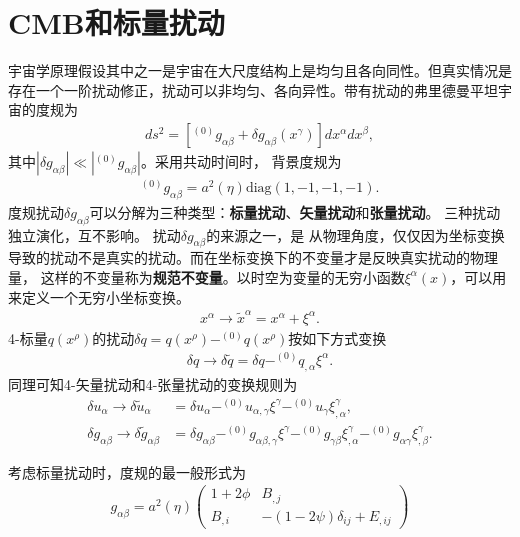 \section{CMB和标量扰动}

宇宙学原理假设其中之一是宇宙在大尺度结构上是均匀且各向同性。但真实情况是存在一个一阶扰动修正，扰动可以非均匀、各向异性。带有扰动的弗里德曼平坦宇宙的度规为
\begin{align}
  \label{eq:perturbation-metric}
  ds^2=\left[^{(0)}g_{\alpha\beta}+\delta g_{\alpha\beta}(x^{\gamma})
  \right]dx^{\alpha}dx^{\beta},
\end{align}
其中$|\delta g_{\alpha\beta}|\ll|^{(0)}g_{\alpha\beta}|$。采用共动时间时，
背景度规为
\begin{align}
  \label{eq:background-metric}
  ^{(0)}g_{\alpha\beta}=a^2(\eta)\text{diag}(1, -1, -1, -1).
\end{align}
度规扰动$\delta
g_{\alpha\beta}$可以分解为三种类型：\textbf{标量扰动}、\textbf{矢量扰动}和\textbf{张量扰动}。
三种扰动独立演化，互不影响。
扰动$\delta g_{\alpha\beta}$的来源之一，是
从物理角度，仅仅因为坐标变换导致的扰动不是真实的扰动。而在坐标变换下的不变量才是反映真实扰动的物理量，
这样的不变量称为\textbf{规范不变量}。以时空为变量的无穷小函数$\xi^{\alpha}(x)$，可以用来定义一个无穷小坐标变换。
\begin{align}
  \label{eq:coordinate-transformation}
  x^{\alpha} \rightarrow \tilde{x}^{\alpha}=x^{\alpha}+\xi^{\alpha}.
\end{align}
4-标量$q(x^{\rho})$的扰动$\delta
q=q(x^{\rho})-^{(0)}q(x^{\rho})$按如下方式变换
\begin{align}
  \label{eq:scalar-perturbation-transformation}
  \delta q \rightarrow \delta\tilde{q}=\delta q
  -^{(0)}q_{,\alpha}\xi^{\alpha}.
\end{align}
同理可知4-矢量扰动和4-张量扰动的变换规则为
\begin{align}
  \label{eq:vector-perturbation-transformation}
  \delta u_{\alpha} \rightarrow \delta\tilde{u}_{\alpha}&=
  \delta
  u_{\alpha}-^{(0)}u_{\alpha,\gamma}\xi^{\gamma}-^{(0)}u_{\gamma}\xi^{\gamma}_{,\alpha},
  \\
  \label{eq:tensor-perturbation-transformation}
  \delta g_{\alpha\beta}\rightarrow\delta \tilde{g}_{\alpha\beta} &=
  \delta g_{\alpha\beta}-^{(0)}g_{\alpha\beta,\gamma}\xi^{\gamma}
  -^{(0)}g_{\gamma\beta}\xi^{\gamma}_{,\alpha}-^{(0)}g_{\alpha\gamma}\xi^{\gamma}_{,\beta}.
\end{align}

考虑标量扰动时，度规的最一般形式为
\begin{align}
  \label{eq:scalar-metric-perturbation}
  g_{\alpha\beta}=a^2(\eta)
  \begin{pmatrix}
    1 + 2\phi & B_{,j} \\
    B_{,i} & -(1-2\psi)\delta_{ij}+E_{,ij}
  \end{pmatrix}
\end{align}

